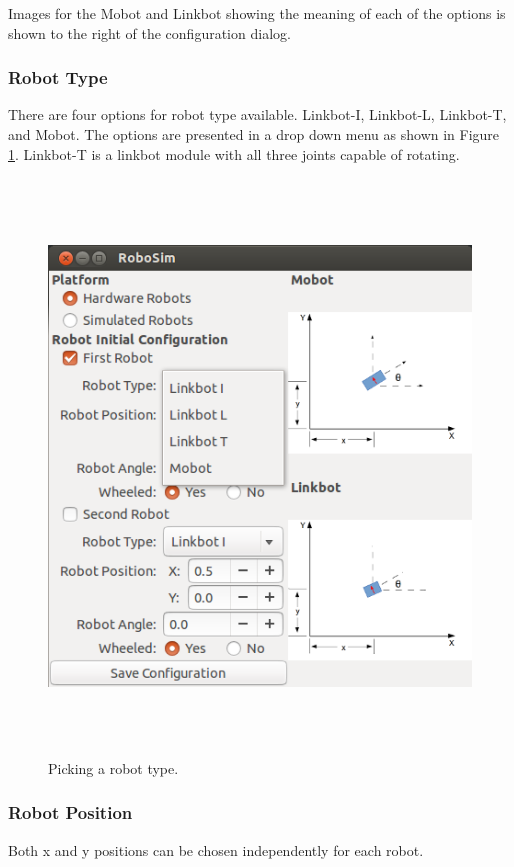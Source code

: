 \documentclass{article}
\begin{document}
Images for the Mobot and Linkbot showing the meaning of each of the options is
shown to the right of the configuration dialog.

\subsubsection{Robot Type}
There are four options for robot type available.  Linkbot-I, Linkbot-L, Linkbot-T, and Mobot.
The options are presented in a drop down menu as shown in Figure \ref{fig:type}.  Linkbot-T is
a linkbot module with all three joints capable of rotating.

\begin{figure}[H]
	\begin{center}
		\includegraphics[height=6in]{images/type}
	\end{center}
	\caption{Picking a robot type.}
	\label{fig:type}
\end{figure}

\subsubsection{Robot Position}
Both x and y positions can be chosen independently for each robot.
\end{document}
